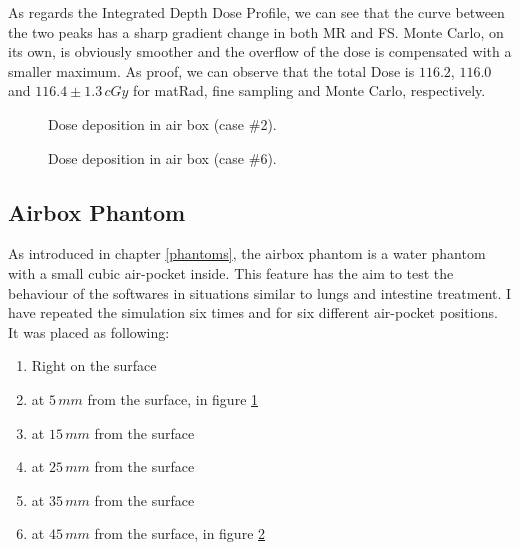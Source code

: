 \documentclass[12pt, a4paper, twoside]{book}
\begin{document}
As regards the Integrated Depth Dose Profile, we can see that the curve between the two peaks has a sharp gradient change in both MR and FS. Monte Carlo, on its own, is obviously smoother and the overflow of the dose is compensated with a smaller maximum. As proof, we can observe that the total Dose is $116.2$, $116.0$ and $116.4\pm1.3\,cGy$ for matRad, fine sampling and Monte Carlo, respectively.

\newpage

\begin{figure}[!t]
\centering
{}\quad
{}\quad
{}\quad
\caption{Dose deposition in air box (case \#2).}
\label{fig:AB2}
\end{figure}


\begin{figure}[!t]
\centering
{}\quad
{}\quad
{}\quad
\caption{Dose deposition in air box (case \#6).}
\label{fig:AB6}
\end{figure}

\subsection{Airbox Phantom}\label{air}
As introduced in chapter \ref{phantoms}, the airbox phantom is a water phantom with a small cubic air-pocket inside. This feature has the aim to test the behaviour of the softwares in situations similar to lungs and intestine treatment. 
I have repeated the simulation six times and for six different air-pocket positions. It was placed as following:

\begin{enumerate}
\item Right on the surface
\item at $5\,mm$ from the surface, in figure \ref{fig:AB2}
\item at $15\,mm$ from the surface
\item at $25\,mm$ from the surface
\item at $35\,mm$ from the surface
\item at $45\,mm$ from the surface, in figure \ref{fig:AB6}
\end{enumerate}
\end{document}
